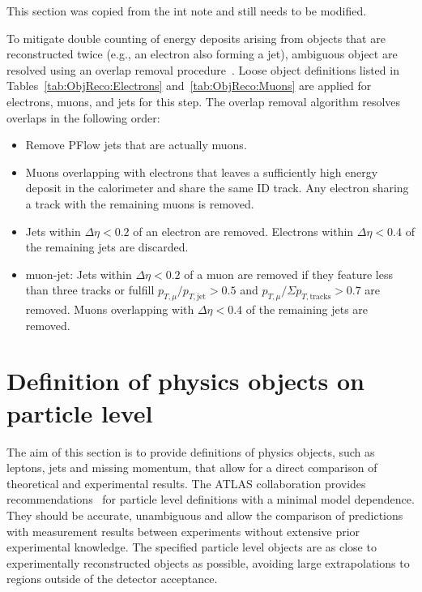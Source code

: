 This section was copied from the int note and still needs to be modified.

To mitigate double counting of energy deposits arising from objects that are reconstructed twice (e.g., an electron also forming a jet),
ambiguous object are resolved using an overlap removal procedure~\cite{Adams:1700874}.
Loose object definitions listed in Tables~\ref{tab:ObjReco:Electrons} and~\ref{tab:ObjReco:Muons} are applied for electrons, muons, and jets for this step.
The overlap removal algorithm resolves overlaps in the following order:
\begin{itemize}
    \item Remove PFlow jets that are actually muons.
    \item Muons overlapping with electrons that leaves a sufficiently high energy deposit
    in the calorimeter and share the same ID track. Any electron sharing a track with the remaining muons is removed.
    \item Jets within $\Delta\eta< 0.2$ of an electron are removed. Electrons within $\Delta\eta< 0.4$ of the remaining jets are discarded.
    \item muon-jet: Jets within $\Delta\eta< 0.2$ of a muon are removed if they feature less than three tracks or fulfill 
    $p_{T,\mu} / p_{T,\text{jet}} > 0.5$ and $p_{T,\mu} / \Sigma p_{T,\text{tracks}} > 0.7$ are removed. Muons overlapping with $\Delta\eta< 0.4$ of the remaining jets are removed.
\end{itemize}



\section{Definition of physics objects on particle level}
\label{sec:ObjReco:Part}
The aim of this section is to provide definitions of physics objects, such as leptons, jets and missing momentum, that allow for a direct comparison of theoretical and experimental results.
The ATLAS collaboration provides recommendations~\cite{ATL-PHYS-PUB-2015-013} for particle level definitions with a minimal model dependence.
They should be accurate, unambiguous and allow the comparison of predictions with measurement results between experiments without extensive prior experimental knowledge.
The specified particle level objects are as close to experimentally reconstructed objects as possible, 
avoiding large extrapolations to regions outside of the detector acceptance.

